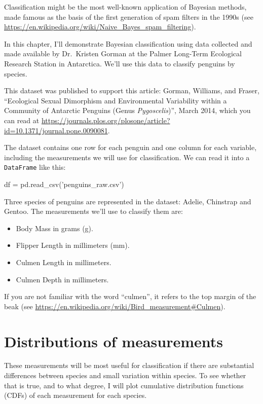 \documentclass[12pt]{book}
\theoremstyle{exercise}
\newcommand{\py}[1]{{\tt #1}}%
\begin{document}
Classification might be the most well-known application of Bayesian
methods, made famous as the basis of the first generation of spam
filters in the 1990s (see \url{https://en.wikipedia.org/wiki/Naive_Bayes_spam_filtering}).

In this chapter, I'll demonstrate Bayesian classification using data
collected and made available by Dr.~Kristen Gorman at the Palmer
Long-Term Ecological Research Station in Antarctica. We'll use this data
to classify penguins by species.

This dataset was published to support this article: Gorman, Williams,
and Fraser, ``Ecological
Sexual Dimorphism and Environmental Variability within a Community of
Antarctic Penguins (Genus \emph{Pygoscelis})'', March 2014, which you can read at \url{https://journals.plos.org/plosone/article?id=10.1371/journal.pone.0090081}.

The dataset contains one row for each penguin and one column for each
variable, including the measurements we will use for classification.
We can read it into a \py{DataFrame} like this:

\begin{code}
df = pd.read_csv('penguins_raw.csv')
\end{code}

Three species of penguins are represented in the dataset: Adelie,
Chinstrap and Gentoo.
The measurements we'll use to classify them are:

\begin{itemize}
\item
  Body Mass in grams (g).
\item
  Flipper Length in millimeters (mm).
\item
  Culmen Length in millimeters.
\item
  Culmen Depth in millimeters.
\end{itemize}

If you are not familiar with the word ``culmen'', it refers to the
top margin of the beak (see \url{https://en.wikipedia.org/wiki/Bird_measurement\#Culmen}).


\section{Distributions of measurements}
\label{distributions-of-measurements}

These measurements will be most useful for classification if there are
substantial differences between species and small variation within
species. To see whether that is true, and to what degree, I will plot
cumulative distribution functions (CDFs) of each measurement for each
species.
\end{document}
